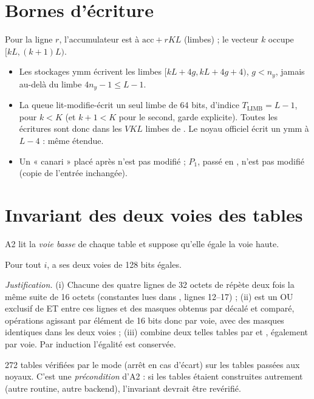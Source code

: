 \section{Bornes d'écriture}
Pour la ligne $r$, l'accumulateur est à $\mathrm{acc}+rKL$ (limbes) ; le vecteur $k$ occupe $[kL,(k+1)L)$.
\begin{itemize}
\item \Pc{} Les stockages ymm écrivent les limbes $[kL+4g,kL+4g+4)$, $g<n_y$, jamais au-delà du limbe $4n_y-1\le L-1$.
\item \Pc{} La queue lit-modifie-écrit un seul limbe de 64 bits, d'indice $T_{\mathrm{LIMB}}=L-1$, pour $k<K$ (et $k+1<K$ pour le second, garde explicite). Toutes les écritures sont donc dans les $VKL$ limbes de . Le noyau officiel écrit un ymm à $L-4$ : même étendue.
\item \Pe{} Un « canari » placé après  n'est pas modifié ; $P_1$, passé en , n'est pas modifié (copie de l'entrée inchangée).
\end{itemize}

\section{Invariant des deux voies des tables}
A2 lit la \emph{voie basse} de chaque table et suppose qu'elle égale la voie haute.
\begin{lemme}\label{lem:voies}\Pc{} Pour tout $i$,  a ses deux voies de 128 bits égales.
\end{lemme}
\emph{Justification.} (i) Chacune des quatre lignes de 32 octets de  répète deux fois la même suite de 16 octets (constantes lues dans , lignes 12--17) ; (ii)  est un OU exclusif de ET entre ces lignes et des masques obtenus par  décalé et comparé, opérations agissant par élément de 16 bits donc par voie, avec des masques identiques dans les deux voies ; (iii)  combine deux telles tables par \code{^} et , également par voie. Par induction l'égalité est conservée.

\Pe{} 272 tables vérifiées par le mode  (arrêt en cas d'écart) sur les tables passées aux noyaux. C'est une \emph{précondition} d'A2 : si les tables étaient construites autrement (autre routine, autre backend), l'invariant devrait être revérifié.

